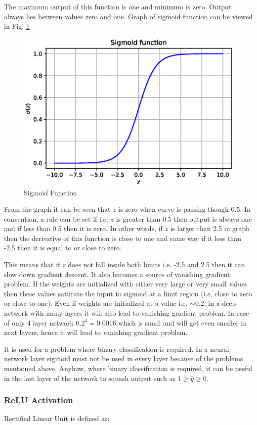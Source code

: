 \documentclass[11pt]{article}
\begin{document}
The maximum output of this function is one and minimum is zero. Output always lies between values zero and one. Graph of sigmoid function can be viewed in Fig. \ref{Sigmoid}

\begin{figure}[ht!]
	\centering
	\includegraphics[width=.6\linewidth]{files/cnn_architecture/sigmoid.eps}
	\caption{Sigmoid Function}
	\label{Sigmoid}
\end{figure}

From the graph it can be seen that $z$ is zero when curve is passing though 0.5. In convention, a rule can be set if i.e. $z$ is greater than 0.5 then output is always one and if less than 0.5 then it is zero. In other words, if $z$ is larger than 2.5 in graph then the derivative of this function is close to one and same way if it less than -2.5 then it is equal to or close to zero.

This means that if $z$ does not fall inside both limits i.e. -2.5 and 2.5 then it can slow down gradient descent. It also becomes a source of vanishing gradient problem. If the weights are initialized with either very large or very small values then these values saturate the input to sigmoid at a limit region (i.e. close to zero or close to one). Even if weights are initialized at a value i.e. $\sim 0.2$, in a deep network with many layers it will also lead to vanishing gradient problem. In case of only 4 layer network $0.2^{4}=0.0016$ which is small and will get even smaller in next layers, hence it will lead to vanishing gradient problem.

It is used for a problem where binary classification is required. In a neural network layer sigmoid must not be used in every layer because of the problems mentioned above. Anyhow, where binary classification is required, it can be useful in the last layer of the network to squash output such as $ 1 \geq \hat{y} \geq 0$.

\subsubsection{ReLU Activation}
Rectified Linear Unit is defined as:
\end{document}
